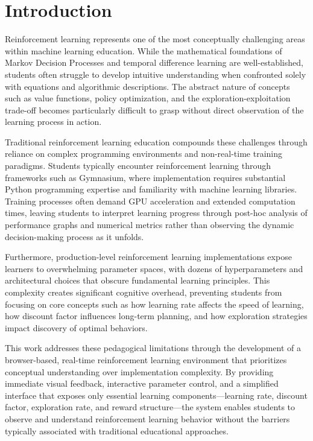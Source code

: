 \section{Introduction}

Reinforcement learning represents one of the most conceptually challenging areas within machine learning education. While the mathematical foundations of Markov Decision Processes and temporal difference learning are well-established, students often struggle to develop intuitive understanding when confronted solely with equations and algorithmic descriptions. The abstract nature of concepts such as value functions, policy optimization, and the exploration-exploitation trade-off becomes particularly difficult to grasp without direct observation of the learning process in action.

Traditional reinforcement learning education compounds these challenges through reliance on complex programming environments and non-real-time training paradigms. Students typically encounter reinforcement learning through frameworks such as Gymnasium, where implementation requires substantial Python programming expertise and familiarity with machine learning libraries. Training processes often demand GPU acceleration and extended computation times, leaving students to interpret learning progress through post-hoc analysis of performance graphs and numerical metrics rather than observing the dynamic decision-making process as it unfolds.

Furthermore, production-level reinforcement learning implementations expose learners to overwhelming parameter spaces, with dozens of hyperparameters and architectural choices that obscure fundamental learning principles. This complexity creates significant cognitive overhead, preventing students from focusing on core concepts such as how learning rate affects the speed of learning, how discount factor influences long-term planning, and how exploration strategies impact discovery of optimal behaviors.

This work addresses these pedagogical limitations through the development of a browser-based, real-time reinforcement learning environment that prioritizes conceptual understanding over implementation complexity. By providing immediate visual feedback, interactive parameter control, and a simplified interface that exposes only essential learning components—learning rate, discount factor, exploration rate, and reward structure—the system enables students to observe and understand reinforcement learning behavior without the barriers typically associated with traditional educational approaches.